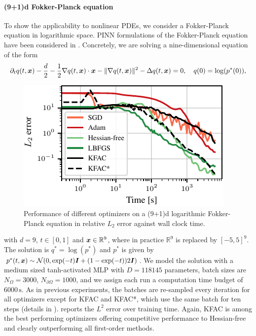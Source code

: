 \paragraph{(9+1)d Fokker-Planck equation} To show the applicability to nonlinear PDEs, we consider a Fokker-Planck equation in logarithmic space. PINN formulations of the
Fokker-Planck equation have been considered in \cite{hu2024score, sun2024dynamical}. Concretely, we are solving a nine-dimensional equation
of the form
\begin{align}
  \partial_t q(t, {\bm{x}})
  -
  \frac{d}{2}
  -
  \frac12 \nabla q(t,{\bm{x}})\cdot {\bm{x}}
  -
  \lVert \nabla q(t,{\bm{x}}) \rVert^2
  -
  \Delta q(t, {\bm{x}})
  =
  0,
  \quad
  q(0)
  =
  \log(p^*(0)),
\end{align}
\begin{figure}
  \centering
  \vspace{-2ex}
  \includegraphics{kfac_pinns_exp/exp43_log_fokker_planck9d_isotropic_gaussian_random/l2_error_over_time.pdf}
  \caption{
    Performance of different optimizers on a (9+1)d logarithmic Fokker-Planck equation in relative $L_2$ error against wall clock time.
  }
  \label{fig:10D-logFP}
\end{figure}
with $d=9$, $t\in[0,1]$ and ${\bm{x}} \in \mathbb R^9$, where in practice $\mathbb R^9$ is replaced by $[-5,5]^9$.
The solution is $q^* = \log(p^*)$ and $p^*$ is given by $p^*(t,{\bm{x}})\sim \mathcal{N}(0, \exp(-t){\bm{I}} + (1-\exp(-t))2{\bm{I}})$.
We model the solution with a medium sized tanh-activated MLP with $D=\num{118145}$ parameters,
batch sizes are $N_{\Omega} = \num{3000}$, $N_{\partial\Omega} = \num{1000}$, and we assign each run a computation time budget of $\num{6000}\,\text{s}$.
As in previous experiments, the batches are re-sampled every iteration for all optimizers except for KFAC and KFAC*, which use the same batch for ten steps (details in ).
 reports the $L^2$ error over training time.
Again, KFAC is among the best performing optimizers offering competitive performance to Hessian-free and clearly outperforming all first-order methods.
